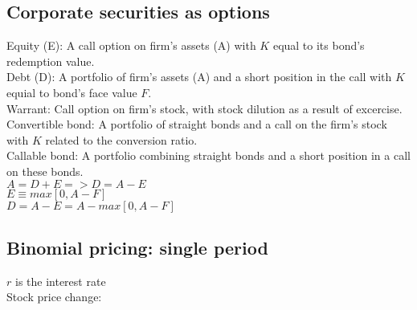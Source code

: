 \subsection*{Corporate securities as options}
Equity (E): A call option on firm's assets (A) with $K$ equal to its bond's redemption value.\\
Debt (D): A portfolio of firm's assets (A) and a short position in the call with $K$ equial to bond's face value $F$.\\
Warrant: Call option on firm's stock, with stock dilution as a result of excercise.\\
Convertible bond: A portfolio of straight bonds and a call on the firm's stock with $K$ related to the conversion ratio.\\
Callable bond: A portfolio combining straight bonds and a short position in a call on these bonds.\\
$A = D + E => D = A - E$\\
$E \equiv max[0, A - F]$\\
$D = A- E = A - max[0, A -F]$
\subsection*{Binomial pricing: single period}
$r$ is the interest rate\\
Stock price change:\\

